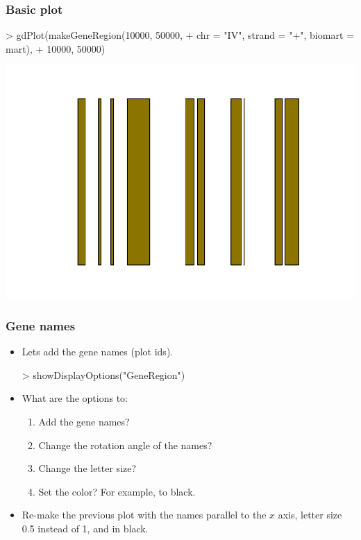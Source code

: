 \begin{frame}
  \frametitle{Basic plot}
\begin{Schunk}
\begin{Sinput}
> gdPlot(makeGeneRegion(10000, 50000, 
+     chr = "IV", strand = "+", biomart = mart), 
+     10000, 50000)
\end{Sinput}
\end{Schunk}
\includegraphics{plots/fig-025}
\end{frame}

\begin{frame}
  \frametitle{Gene names}
  \begin{itemize}
  \item Lets add the \alert{gene names} (plot ids).
\begin{Schunk}
\begin{Sinput}
> showDisplayOptions("GeneRegion")
\end{Sinput}
\end{Schunk}
  \item What are the options to:
  \begin{enumerate}
  \item Add the gene names?
  \item Change the rotation angle of the names? 
  \item Change the letter size?
  \item Set the color? For example, to black.
  \end{enumerate}
  \item Re-make the previous plot with the names parallel to the $x$ axis, letter size 0.5 instead of 1, and in black.
  \end{itemize}
\end{frame}

